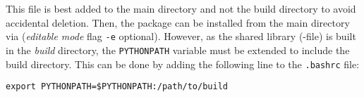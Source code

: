 This file is best added to the main directory and not the build directory to avoid accidental deletion.
Then, the package can be installed from the main directory via  (\textit{editable mode} flag \texttt{-e} optional). However, as the shared library (-file) is built in the \textit{build} directory, the \texttt{PYTHONPATH} variable must be extended to include the build directory.
This can be done by adding the following line to the \texttt{.bashrc} file:
\begin{lstlisting}[style=BashStyle]
    export PYTHONPATH=$PYTHONPATH:/path/to/build
\end{lstlisting}
